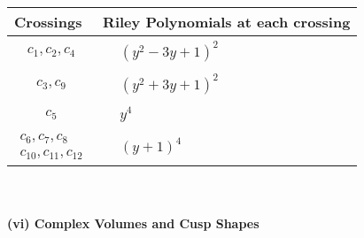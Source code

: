 \documentclass[1p]{elsarticle_modified}
\theoremstyle{definition}
\begin{document}
\begin{tabular}{m{50pt}|m{274pt}}
Crossings & \hspace{64pt}Riley Polynomials at each crossing \\
\hline $$\begin{aligned}c_{1},c_{2},c_{4}\end{aligned}$$&$\begin{aligned}
&(y^2-3 y+1)^2
\end{aligned}$\\
\hline $$\begin{aligned}c_{3},c_{9}\end{aligned}$$&$\begin{aligned}
&(y^2+3 y+1)^2
\end{aligned}$\\
\hline $$\begin{aligned}c_{5}\end{aligned}$$&$\begin{aligned}
&y^4
\end{aligned}$\\
\hline $$\begin{aligned}c_{6},c_{7},c_{8}\\c_{10},c_{11},c_{12}\end{aligned}$$&$\begin{aligned}
&(y+1)^4
\end{aligned}$\\
\hline
\end{tabular}\\~\\
\newpage\flushleft \textbf{(vi) Complex Volumes and Cusp Shapes}
\end{document}
